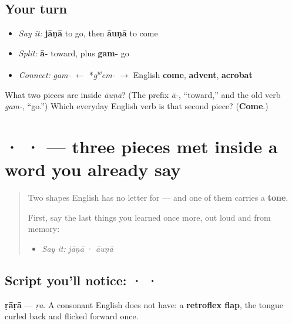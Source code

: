 \subsection*{Your turn}
\begin{itemize}
\raggedright
  \item \emph{Say it:} \textbf{jāṇā} to go, then \textbf{āuṇā} to come
  \item \emph{Split:} \textbf{ā-} toward, plus \textbf{gam-} go
  \item \emph{Connect:} \emph{gam-} $\leftarrow$ *\emph{g\textsuperscript{w}em-} $\to$ English \textbf{come}, \textbf{advent}, \textbf{acrobat}
\end{itemize}

\begin{tcolorbox}[breakable,colback=teal!4,colframe=teal!35!black,title={Before you move on}]
What two pieces are inside \emph{āuṇā}? (The prefix \emph{ā-}, “toward,” and the old verb \emph{gam-}, “go.”) Which everyday English verb is that second piece? (\textbf{Come}.)
\end{tcolorbox}
\section[\texorpdfstring{\pa{ੜ} · \pa{ਘ} · \pa{ਦ} (ṛa · gha · da)}{ੜ · ਘ · ਦ (ṛa · gha · da)}]{ ·  ·  — three pieces met inside a word you already say}

\label{lesson:PA-S07-rara-ghagga-dadda}



\begin{quote}
Two shapes English has no letter for — and one of them carries a \textbf{tone}.

First, say the last things you learned once more, out loud and from memory:

\begin{itemize}
\raggedright
  \item \emph{Say it:} \emph{jāṇā} · \emph{āuṇā}
\end{itemize}
\end{quote}

\subsection*{Script you'll notice:  ·  · }
\begin{quote}
\end{quote}

\textbf{ṛāṛā} — \emph{ṛa}. A consonant English does not have: a \textbf{retroflex flap}, the tongue curled back and flicked forward once.

